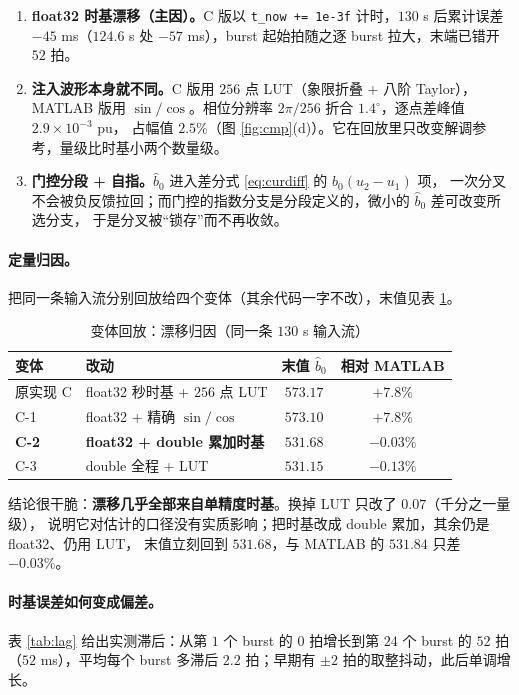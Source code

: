 \documentclass[11pt,a4paper]{ctexart}
\begin{document}
\begin{enumerate}
\item \textbf{float32 时基漂移（主因）。}C 版以 \texttt{t\_now += 1e-3f} 计时，$130$ s 后累计误差
$-45$ ms（$124.6$ s 处 $-57$ ms），burst 起始拍随之逐 burst 拉大，末端已错开 $52$ 拍。
\item \textbf{注入波形本身就不同。}C 版用 $256$ 点 LUT（象限折叠 + 八阶 Taylor），MATLAB 版用
$\sin/\cos$。相位分辨率 $2\pi/256$ 折合 $1.4^\circ$，逐点差峰值 $2.9\times10^{-3}$ pu，
占幅值 $2.5\%$（图 \ref{fig:cmp}(d)）。它在回放里只改变解调参考，量级比时基小两个数量级。
\item \textbf{门控分段 + 自指。}$\hat b_0$ 进入差分式 \eqref{eq:curdiff} 的 $b_0(u_2-u_1)$ 项，
一次分叉不会被负反馈拉回；而门控的指数分支是分段定义的，微小的 $\hat b_0$ 差可改变所选分支，
于是分叉被“锁存”而不再收敛。
\end{enumerate}


\paragraph{定量归因。}把同一条输入流分别回放给四个变体（其余代码一字不改），末值见表 \ref{tab:variant}。

\begin{table}[H]
\centering
\caption{变体回放：漂移归因（同一条 $130$ s 输入流）}
\label{tab:variant}
\small
\begin{tabular}{llcc}
\toprule
变体 & 改动 & 末值 $\hat b_0$ & 相对 MATLAB \\
\midrule
原实现 C & float32 秒时基 + $256$ 点 LUT & $573.17$ & $+7.8\%$\\
C-1 & float32 + 精确 $\sin/\cos$ & $573.10$ & $+7.8\%$\\
\textbf{C-2} & \textbf{float32 + double 累加时基} & $\bm{531.68}$ & $\bm{-0.03\%}$\\
C-3 & double 全程 + LUT & $531.15$ & $-0.13\%$\\
\bottomrule
\end{tabular}
\end{table}

结论很干脆：\textbf{漂移几乎全部来自单精度时基}。换掉 LUT 只改了 $0.07$（千分之一量级），
说明它对估计的口径没有实质影响；把时基改成 double 累加，其余仍是 float32、仍用 LUT，
末值立刻回到 $531.68$，与 MATLAB 的 $531.84$ 只差 $-0.03\%$。

\paragraph{时基误差如何变成偏差。}表 \ref{tab:lag} 给出实测滞后：从第 $1$ 个 burst 的 $0$ 拍增长到第 $24$ 个 burst 的 $52$ 拍
（$52$ ms），平均每个 burst 多滞后 $2.2$ 拍；早期有 $\pm2$ 拍的取整抖动，此后单调增长。
\end{document}

